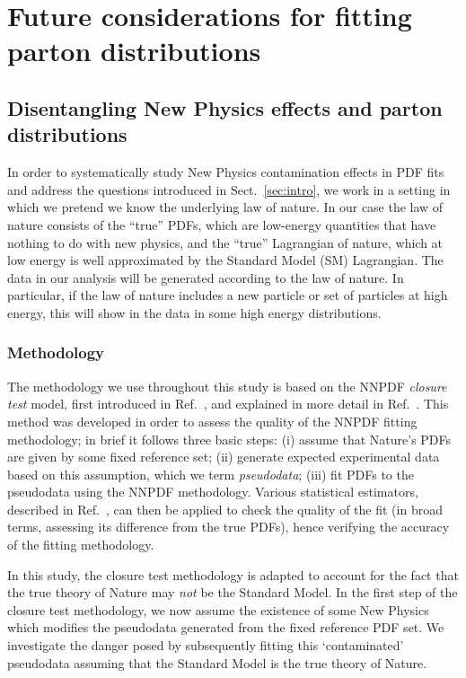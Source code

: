 \documentclass[withindex,glossary]{cam-thesis}
\begin{document}
\newpage
\part{Future considerations for fitting parton distributions}
\chapter{Disentangling New Physics effects and parton distributions}
\label{chap:contamination}

In order to systematically study New Physics contamination effects in PDF fits and address
the questions introduced in Sect.~\ref{sec:intro}, we work in a setting in which we pretend
we know the underlying law of nature. In our case the law of nature consists of the ``true''
PDFs, which are low-energy quantities that have nothing to do with new physics, and the ``true''
Lagrangian of nature, which at low energy is well approximated by the Standard Model (SM) Lagrangian.
The data in our analysis will be generated according to the law of nature.
In particular, if the law of nature includes a new particle or set of particles at high energy,
this will show in the data in some high energy distributions.

\section{Methodology}
\label{sec:methodology}

The methodology we use throughout this study is based on the NNPDF \textit{closure test} model,
first introduced in Ref.~\cite{NNPDF:2014otw}, and explained in more detail in Ref.~\cite{DelDebbio:2021whr}.
This method was developed
in order to assess the quality of the NNPDF fitting methodology; in brief it follows three basic steps: (i) assume that Nature's PDFs
are given by some fixed reference set; (ii) generate expected experimental data based on this assumption, which we term \textit{pseudodata}; (iii) fit PDFs to the pseudodata using the NNPDF methodology. Various statistical estimators, described in Ref.~\cite{DelDebbio:2021whr}, can then be applied to 
check the quality of the fit (in broad terms, assessing its difference from the true PDFs), hence verifying the accuracy of the fitting methodology.

In this study, the closure test methodology is adapted to account for the fact that the true theory of Nature may \textit{not} be the 
Standard Model. In the first step of the closure test methodology, we now assume the existence of some New Physics which modifies
the pseudodata generated from the fixed reference PDF set. We investigate the danger posed by subsequently fitting this `contaminated' pseudodata assuming that the Standard Model is the true theory of Nature.
\end{document}
